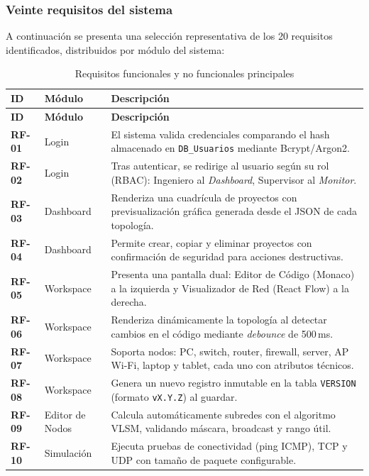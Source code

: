 \documentclass[11pt,letterpaper,oneside]{article}
\begin{document}
\subsubsection{Veinte requisitos del sistema}

A continuación se presenta una selección representativa de los 20 requisitos identificados, distribuidos por módulo del sistema:

\renewcommand{\arraystretch}{1.2}
\begin{longtable}{@{}>{\bfseries\color{uvblue}}p{1.5cm} p{2.5cm} p{9cm}@{}}
\caption{Requisitos funcionales y no funcionales principales}\label{tab:reqs}\\
\toprule
\textbf{ID} & \textbf{Módulo} & \textbf{Descripción}\\
\midrule
\endfirsthead
\toprule
\textbf{ID} & \textbf{Módulo} & \textbf{Descripción}\\
\midrule
\endhead
RF-01 & Login           & El sistema valida credenciales comparando el hash almacenado en \texttt{DB\_Usuarios} mediante Bcrypt/Argon2.\\
RF-02 & Login           & Tras autenticar, se redirige al usuario según su rol (RBAC): Ingeniero al \emph{Dashboard}, Supervisor al \emph{Monitor}.\\
RF-03 & Dashboard       & Renderiza una cuadrícula de proyectos con previsualización gráfica generada desde el JSON de cada topología.\\
RF-04 & Dashboard       & Permite crear, copiar y eliminar proyectos con confirmación de seguridad para acciones destructivas.\\
RF-05 & Workspace       & Presenta una pantalla dual: Editor de Código (Monaco) a la izquierda y Visualizador de Red (React Flow) a la derecha.\\
RF-06 & Workspace       & Renderiza dinámicamente la topología al detectar cambios en el código mediante \emph{debounce} de 500\,ms.\\
RF-07 & Workspace       & Soporta nodos: PC, switch, router, firewall, server, AP Wi-Fi, laptop y tablet, cada uno con atributos técnicos.\\
RF-08 & Workspace       & Genera un nuevo registro inmutable en la tabla \texttt{VERSION} (formato \texttt{vX.Y.Z}) al guardar.\\
RF-09 & Editor de Nodos & Calcula automáticamente subredes con el algoritmo VLSM, validando máscara, broadcast y rango útil.\\
RF-10 & Simulación      & Ejecuta pruebas de conectividad (ping ICMP), TCP y UDP con tamaño de paquete configurable.\\

\end{longtable}
\end{document}
